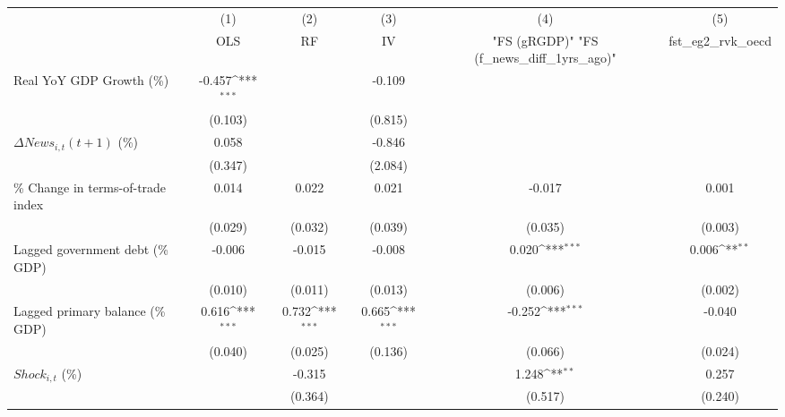 {
\def\sym#1{\ifmmode^{#1}\else\(^{#1}\)\fi}
\begin{tabular}{l*{5}{c}}
\toprule
                    &\multicolumn{1}{c}{(1)}&\multicolumn{1}{c}{(2)}&\multicolumn{1}{c}{(3)}&\multicolumn{1}{c}{(4)}&\multicolumn{1}{c}{(5)}\\
                    &\multicolumn{1}{c}{OLS}&\multicolumn{1}{c}{RF}&\multicolumn{1}{c}{IV}&\multicolumn{1}{c}{ "FS (gRGDP)"  "FS (f_news_diff_1yrs_ago)" }&\multicolumn{1}{c}{fst_eg2_rvk_oecd}\\
\midrule
Real YoY GDP Growth (\%)&      -0.457\sym{***}&                     &      -0.109         &                     &                     \\
                    &     (0.103)         &                     &     (0.815)         &                     &                     \\
\addlinespace
$ \Delta News_{i,t}(t+1)$ (\%)&       0.058         &                     &      -0.846         &                     &                     \\
                    &     (0.347)         &                     &     (2.084)         &                     &                     \\
\addlinespace
\% Change in terms-of-trade index&       0.014         &       0.022         &       0.021         &      -0.017         &       0.001         \\
                    &     (0.029)         &     (0.032)         &     (0.039)         &     (0.035)         &     (0.003)         \\
\addlinespace
Lagged government debt (\% GDP)&      -0.006         &      -0.015         &      -0.008         &       0.020\sym{***}&       0.006\sym{**} \\
                    &     (0.010)         &     (0.011)         &     (0.013)         &     (0.006)         &     (0.002)         \\
\addlinespace
Lagged primary balance (\% GDP)&       0.616\sym{***}&       0.732\sym{***}&       0.665\sym{***}&      -0.252\sym{***}&      -0.040         \\
                    &     (0.040)         &     (0.025)         &     (0.136)         &     (0.066)         &     (0.024)         \\
\addlinespace
$ Shock_{i,t}$ (\%) &                     &      -0.315         &                     &       1.248\sym{**} &       0.257         \\
                    &                     &     (0.364)         &                     &     (0.517)         &     (0.240)         \\

\end{tabular}}
